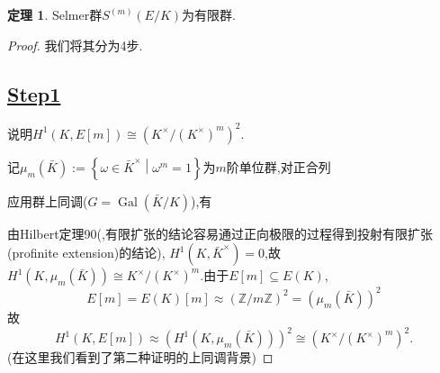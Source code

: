 \documentclass[12pt,A4paper,oneside,reqno]{amsart}
\numberwithin{equation}{section}
\theoremstyle{definition}
\newtheorem{theorem}{定理}[section]
\theoremstyle{plain}
\theoremstyle{plain}
\numberwithin{equation}{section}
\theoremstyle{remark}
\newcommand{\Gal}{\operatorname{Gal}}
\begin{document}
\begin{theorem}
	Selmer群$S^{(m)}(E/K)$为有限群.
\end{theorem}
\begin{proof}
	我们将其分为4步.

\subsection*{\underline{Step1}}
说明$H^1(K,E[m]) \cong (K^{\times}/(K^{\times})^m)^2$.

记$\mu_m(\bar{K}):=\left\{\omega \in \bar{K}^{\times} \middle|\omega^m=1 \right\}$为$m$阶单位群,对正合列
	\begin{center}
	\end{center}
应用群上同调($G=\Gal(\bar{K}/K)$),有
	\begin{center}
	\end{center}
由Hilbert定理90(\cite[p97, Corollary 10.4]{morandi2012field},有限扩张的结论容易通过正向极限的过程得到投射有限扩张(profinite extension)的结论), $H^1(K,\bar{K}^{\times})=0$,故$H^1(K,\mu_m(\bar{K}))\cong K^{\times}/(K^{\times})^m$.由于$E[m] \subseteq E(K)$,
$$E[m]=E(K)[m] \approx (\mathbb{Z}/m\mathbb{Z})^2=(\mu_m(\bar{K}))^2$$
故
$$H^1(K,E[m]) \approx (H^1(K,\mu_m(\bar{K})))^2 \cong (K^{\times}/(K^{\times})^m)^2.$$
(在这里我们看到了第二种证明的上同调背景)

\end{proof}
\end{document}

